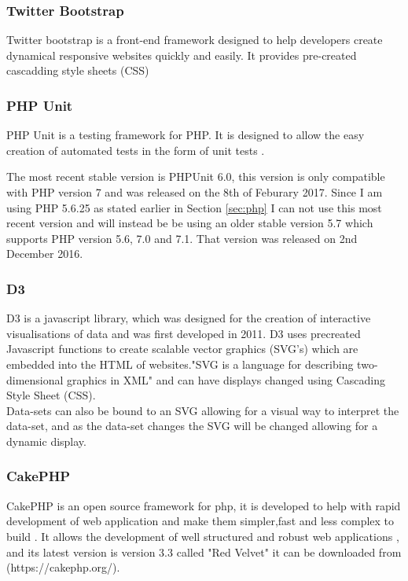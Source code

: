 \documentclass[12pt]{article}  %
\begin{document}
\subsubsection{Twitter Bootstrap}
Twitter bootstrap is a front-end framework \cite{noauthor_bootstrap_nodate} designed to help developers create dynamical responsive websites quickly and easily. It provides pre-created cascadding style sheets (CSS)

\subsubsection{PHP Unit}

PHP Unit is a testing framework for PHP. It is designed to allow the easy creation of automated tests in the form of unit tests \cite{bergmann_phpunit_2005}. 

The most recent stable version is PHPUnit 6.0, this version is only compatible with PHP version 7 and was released on the 8th of Feburary 2017. Since I am using PHP 5.6.25 as stated earlier in Section \ref{sec:php} I can not use this most recent version and will instead be be using an older stable version 5.7 which supports PHP version 5.6, 7.0 and 7.1. That version was released on 2nd December 2016.



\subsubsection{D3}
D3 \cite{bostock_d3.js_nodate} is a javascript library, which was designed for the creation of interactive visualisations of data and was first developed in 2011. D3 uses precreated Javascript functions to create scalable vector graphics (SVG's) which are embedded into the HTML of websites."SVG is a language for describing two-dimensional graphics in XML"\cite{ferraiolo_scalable_2000} and can have displays changed  using Cascading Style Sheet (CSS).  \\
Data-sets can also be bound to an SVG allowing for a visual way to interpret the data-set, and as the data-set changes the SVG will be changed allowing for a dynamic display.



\subsubsection{CakePHP}
CakePHP is an open source framework for php, it is developed to help with rapid development of web application and make them simpler,fast and less complex to build \cite{noauthor_cakephp_nodate}. It allows the development of well structured and robust web applications \cite{plekhanova_evaluating_2009}, and its latest version is version 3.3 called "Red Velvet" it can be downloaded from (https://cakephp.org/).
\end{document}
